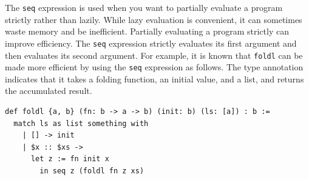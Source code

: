 The \lstinline{seq} expression is used when you want to partially evaluate a program strictly rather than lazily.
While lazy evaluation is convenient, it can sometimes waste memory and be inefficient.
Partially evaluating a program strictly can improve efficiency.
The \lstinline{seq} expression strictly evaluates its first argument and then evaluates its second argument.
For example, it is known that \lstinline{foldl} can be made more efficient by using the \lstinline{seq} expression as follows.
The type annotation indicates that it takes a folding function, an initial value, and a list, and returns the accumulated result.
\begin{lstlisting}[language=egison,numbers=none]
def foldl {a, b} (fn: b -> a -> b) (init: b) (ls: [a]) : b :=
  match ls as list something with
    | [] -> init
    | $x :: $xs ->
      let z := fn init x
        in seq z (foldl fn z xs)
\end{lstlisting}
      
